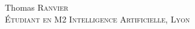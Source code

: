 \parbox[top][0.09\textheight][c]{\linewidth}{
	\centering
    {\sffamily\Huge Thomas \textsc{Ranvier}}\\\medskip
    {\LARGE\color{headings}\textsc{Étudiant en M2 Intelligence Artificielle, \textsc{Lyon}}}
}
